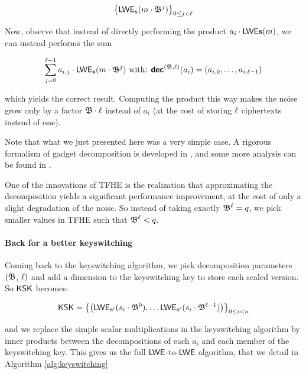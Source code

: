 \[
	\left \lbrace \textsf{LWE}_{\mathbf s}(m \cdot \mathfrak{B}^j) \right \rbrace_{0 \le j < \ell}
\]

Now, observe that instead of directly performing the product $a_i \cdot \textsf{LWE}{\mathbf s}(m)$, we can instead performs the sum 

\[
	\sum_{j=0}^{\ell - 1} a_{i,j} \cdot \textsf{LWE}_{\mathbf s}(m \cdot \mathfrak{B}^j) \text{ with: } \textbf{\textsf{dec}}^{(\mathfrak{B}, \ell)}(a_i) = (a_{i, 0}, \dots, a_{i, \ell-1})
\]

which yields the correct result. Computing the product this way makes the noise grow only by a factor $\mathfrak{B} \cdot \ell$ instead of $a_i$ (at the cost of storing $\ell$ ciphertexts instead of one).



Note that what we just presented here was a very simple case. A rigorous formalism of gadget decomposition is developed in \cite{EC:GenMicPol19}, and some more analysis can be found in \cite{AC:Joye21}.


One of the innovations of TFHE is the realization that approximating the decomposition yields a significant performance improvement, at the cost of only a slight degradation of the noise. So instead of taking exactly $\mathfrak{B}^\ell = q$, we pick smaller values in TFHE such that $\mathfrak{B}^\ell < q$.


\paragraph{Back for a better keyswitching}

Coming back to the keyswitching algorithm, we pick decomposition parameters $(\mathfrak{B}$, $\ell)$ and add a dimension to the keyswitching key to store each scaled version. So $\textsf{KSK}$ becomes:

\[
	\textsf{KSK} = \left \lbrace \left ( \textsf{LWE}_{\mathbf s'} (s_i \cdot \mathfrak{B}^0), \dots  \textsf{LWE}_{\mathbf s'} (s_i \cdot \mathfrak{B}^{\ell-1}) \right ) \right \rbrace_{0 \le i < n}
\]


and we replace the simple scalar multiplications in the keyswitching algorithm by inner products between the decompositions of each $a_i$ and each member of the keyswitching key. This gives us the full $\textsf{LWE}$-to-$\textsf{LWE}$ algorithm, that we detail in Algorithm \ref{alg:keyswitching}



